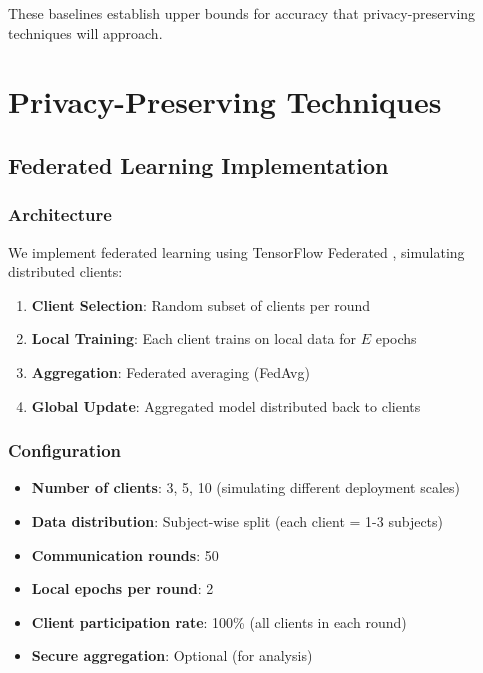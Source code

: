 \documentclass[conference]{IEEEtran}
\begin{document}
These baselines establish upper bounds for accuracy that privacy-preserving techniques will approach.

\section{Privacy-Preserving Techniques}
\label{sec:privacy_methods}

\subsection{Federated Learning Implementation}

\subsubsection{Architecture}

We implement federated learning using TensorFlow Federated \cite{tensorflow_federated}, simulating distributed clients:

\begin{enumerate}
    \item \textbf{Client Selection}: Random subset of clients per round
    \item \textbf{Local Training}: Each client trains on local data for $E$ epochs
    \item \textbf{Aggregation}: Federated averaging (FedAvg) \cite{mcmahan2017communication}
    \item \textbf{Global Update}: Aggregated model distributed back to clients
\end{enumerate}

\subsubsection{Configuration}

\begin{itemize}
    \item \textbf{Number of clients}: 3, 5, 10 (simulating different deployment scales)
    \item \textbf{Data distribution}: Subject-wise split (each client = 1-3 subjects)
    \item \textbf{Communication rounds}: 50
    \item \textbf{Local epochs per round}: 2
    \item \textbf{Client participation rate}: 100\% (all clients in each round)
    \item \textbf{Secure aggregation}: Optional (for analysis)
\end{itemize}
\end{document}
